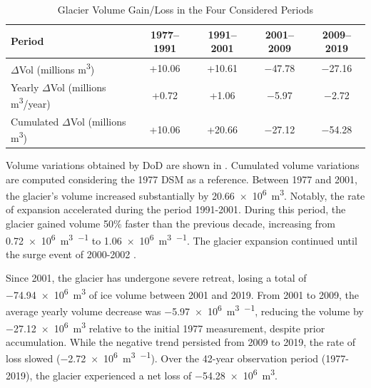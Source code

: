 \begin{table}[ht]
  \centering
  \caption{Glacier Volume Gain/Loss in the Four Considered Periods}
  \label{tab:2:glacier_volume_variations}
  \begin{tabular}{lcccc}
    \hline
    Period & 1977--1991 & 1991--2001 & 2001--2009 & 2009--2019 \\
    \hline
    $\Delta$Vol (millions m\textsuperscript{3}) & +10.06 & +10.61 & $-$47.78 & $-$27.16 \\
    Yearly $\Delta$Vol (millions m\textsuperscript{3}/year) & +0.72 & +1.06 & $-$5.97 & $-$2.72 \\
    Cumulated $\Delta$Vol (millions m\textsuperscript{3}) & +10.06 & +20.66 & $-$27.12 & $-$54.28 \\
    \hline
  \end{tabular}
\end{table}

Volume variations obtained by DoD are shown in .
Cumulated volume variations are computed considering the 1977 DSM as a reference.
Between 1977 and 2001, the glacier's volume increased substantially by \SI[retain-explicit-plus]{+20.66e6}{\cubic\meter}.
Notably, the rate of expansion accelerated during the period 1991-2001.
During this period, the glacier gained volume 50\% faster than the previous decade, increasing from \SI[retain-explicit-plus]{+0.72e6}{\cubic\meter\per\year} to \SI[retain-explicit-plus]{+1.06e6}{\cubic\meter\per\year}.
The glacier expansion continued until the surge event of 2000-2002 \citep{Haeberli2002, Kaab2004, Mortara2009}.

Since 2001, the glacier has undergone severe retreat, losing a total of \SI{-74.94e6}{\cubic\meter} of ice volume between 2001 and 2019.
From 2001 to 2009, the average yearly volume decrease was \SI{-5.97e6}{\cubic\meter\per\year}, reducing the volume by \SI{-27.12e6}{\cubic\meter} relative to the initial 1977 measurement, despite prior accumulation.
While the negative trend persisted from 2009 to 2019, the rate of loss slowed (\SI{-2.72e6}{\cubic\meter\per\year}).
Over the 42-year observation period (1977-2019), the glacier experienced a net loss of \SI{-54.28e6}{\cubic\meter}.

